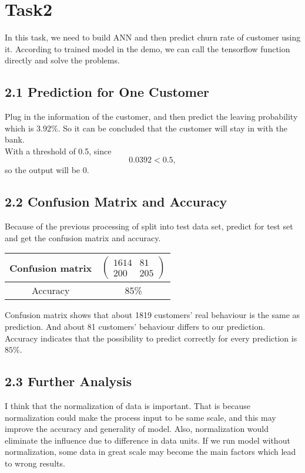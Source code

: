 \documentclass{article}
\begin{document}
\section*{Task2}
In this task, we need to build ANN and then predict churn rate of customer using it.
According to trained model in the demo, we can call the tensorflow function directly and solve the problems.
\subsection*{2.1 Prediction for One Customer}
Plug in the information of the customer, and then predict the leaving probability which is 3.92\%.
So it can be concluded that the customer will stay in with the bank.\\
With a threshold of 0.5, since \[0.0392<0.5,\] so the output will be 0.

\subsection*{2.2 Confusion Matrix and Accuracy}
Because of the previous processing of split into test data set, 
predict for test set and get the confusion matrix and accuracy.\\
\begin{center}
    \begin{tabular}{c|c}
        Confusion matrix & $\begin{pmatrix}
            1614&81\\
            200&205    \end{pmatrix}$\\
        \hline
        Accuracy         & 85\%
    \end{tabular}
\end{center}
Confusion matrix shows that about 1819 customers' real behaviour is the same as prediction.
And about 81 customers' behaviour differs to our prediction.
Accuracy indicates that the possibility to predict correctly for every prediction is $85\%$.

\subsection*{2.3 Further Analysis}
I think that the normalization of data is important. 
That is because normalization could make the process input to be same scale,
and this may improve the accuracy and generality of model.
Also, normalization would eliminate the influence due to difference in data units.
If we run model without normalization, some data in great scale may become the main factors 
which lead to wrong results.
\end{document}
